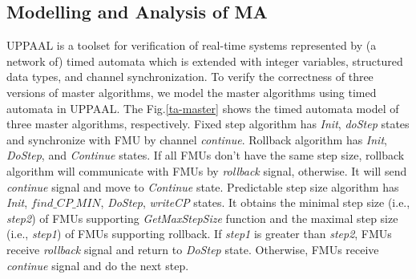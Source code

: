 \subsection{Modelling and Analysis of MA} 
UPPAAL \cite{BehrmannDLHPYH06} is a toolset for verification of real-time systems represented by (a network of) timed automata which is extended with integer variables, structured data types, and channel synchronization. To verify the correctness of three versions of master algorithms, we model the master algorithms using timed automata in UPPAAL. The Fig.\ref{ta-master} shows the timed automata model of three master algorithms,  respectively. Fixed step algorithm has \emph{Init}, \emph{doStep} states and synchronize with FMU by channel \emph{continue}. Rollback algorithm has \emph{Init}, \emph{DoStep}, and \emph{Continue} states. If all FMUs don't have the same step size, rollback algorithm will communicate with FMUs by \emph{rollback} signal, otherwise. It will send \emph{continue} signal and move to \emph{Continue} state. Predictable step size algorithm has \emph{Init}, $find \_ CP \_ MIN$, \emph{DoStep}, \emph{writeCP} states. It obtains the minimal step size (i.e., \emph{step2}) of FMUs supporting \emph{GetMaxStepSize} function and the maximal step size (i.e., \emph{step1}) of FMUs supporting rollback. If \emph{step1} is greater than \emph{step2}, FMUs receive \emph{rollback} signal and return to \emph{DoStep} state. Otherwise, FMUs receive \emph{continue} signal and do the next step.  



\begin{figure}[htbp]
\end{figure}


